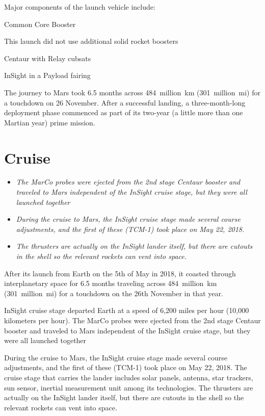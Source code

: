 Major components of the launch vehicle include:

Common Core Booster

This launch did not use additional solid rocket boosters

Centaur with Relay cubsats

InSight in a Payload fairing

The journey to Mars took 6.5 months across 484~million~km
(301~million~mi) for a touchdown on 26 November. After a successful
landing, a three-month-long deployment phase commenced as part of its
two-year (a little more than one Martian year) prime mission.

\section{Cruise}\label{cruise}

\begin{itemize}
\item
  \emph{The MarCo probes were ejected from the 2nd stage Centaur booster
  and traveled to Mars independent of the InSight cruise stage, but they
  were all launched together}
\item
  \emph{During the cruise to Mars, the InSight cruise stage made several
  course adjustments, and the first of these (TCM-1) took place on May
  22, 2018.}
\item
  \emph{The thrusters are actually on the InSight lander itself, but
  there are cutouts in the shell so the relevant rockets can vent into
  space.}
\end{itemize}

After its launch from Earth on the 5th of May in 2018, it coasted
through interplanetary space for 6.5 months traveling across
484~million~km (301~million~mi) for a touchdown on the 26th November in
that year.

InSight cruise stage departed Earth at a speed of 6,200 miles per hour
(10,000 kilometers per hour). The MarCo probes were ejected from the 2nd
stage Centaur booster and traveled to Mars independent of the InSight
cruise stage, but they were all launched together

During the cruise to Mars, the InSight cruise stage made several course
adjustments, and the first of these (TCM-1) took place on May 22, 2018.
The cruise stage that carries the lander includes solar panels, antenna,
star trackers, sun sensor, inertial measurement unit among its
technologies. The thrusters are actually on the InSight lander itself,
but there are cutouts in the shell so the relevant rockets can vent into
space.

